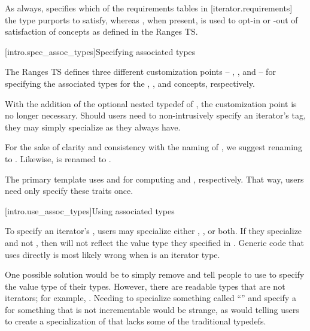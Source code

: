 \pnum
As always,  specifies which of
the requirements tables in [iterator.requirements] the type  purports
to satisfy, whereas , when
present, is used to opt-in or -out of satisfaction of concepts as defined in the
Ranges TS.

[intro.spec_assoc_types]{Specifying associated types}

\pnum
The Ranges TS defines three different customization points --
, , and
 -- for specifying the associated types for
the , , and 
concepts, respectively.

\pnum
With the addition of the optional  nested typedef of
, the 
customization point is no longer necessary. Should users need to non-intrusively
specify an iterator's tag, they may simply specialize 
as they always have.

\pnum
For the sake of clarity and consistency with the naming of
, we suggest renaming
 to .
Likewise,  is renamed to
.

\pnum
The primary  template uses
 and
 for computing 
and , respectively. That way, users need only specify
these traits once.

[intro.use_assoc_types]{Using associated types}

\pnum
To specify an iterator's , users may specialize either
, , or both.
If they specialize  and not ,
then  will not reflect the value type they
specified in . Generic code that uses
 directly is
most likely wrong when  is an iterator type.

\pnum
One possible solution would be to simply remove 
and tell people to use  to specify the value type of their
 types. However, there are readable types that are not iterators;
for example, . Needing to specialize something called
``'' and specify a  for something
that is not incrementable would be strange, as would telling users to create a
specialization of  that lacks some of the traditional
typedefs.

